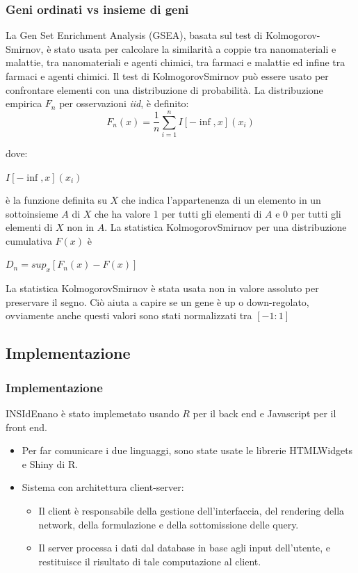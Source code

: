 \documentclass{beamer}
\begin{document}
\begin{frame}
\frametitle{Geni ordinati vs insieme di geni}
La Gen Set Enrichment Analysis (GSEA), basata sul test di Kolmogorov-Smirnov, è stato usata per calcolare la similarità a coppie tra nanomateriali e malattie, tra nanomateriali e agenti chimici, tra farmaci e malattie ed infine tra farmaci e agenti chimici. Il test di KolmogorovSmirnov può essere usato per confrontare elementi con una distribuzione di probabilità. La distribuzione empirica $F_n$ per osservazioni \textit{iid}, è definito:
\begin{equation}
F_n(x) = \frac{1}{n} \sum\limits_{i=1}^n I[-\inf,x](x_i)
\end{equation}
\end{frame}

\begin{frame}
dove:
\begin{center}
$I[-\inf,x](x_i)$
\end{center}
è la funzione definita su $X$ che indica l'appartenenza di un elemento in un sottoinsieme $A$ di $X$ che ha valore 1 per tutti gli elementi di $A$ e 0 per tutti gli elementi di $X$ non in $A$. La statistica KolmogorovSmirnov per una distribuzione cumulativa $F(x)$ è 
\begin{center}
$D_n = sup_x[F_n(x)- F(x)]$
\end{center}
La statistica KolmogorovSmirnov è stata usata non in valore assoluto per preservare il segno. Ciò aiuta a capire se un gene è up o down-regolato, ovviamente anche questi valori sono stati normalizzati tra $[-1:1]$
\end{frame}

\subsection{Implementazione}
\begin{frame}
\frametitle{Implementazione}
INSIdEnano è stato implemetato usando $R$ per il back end e Javascript per il front end.
\begin{itemize}
 \item Per far comunicare i due linguaggi, sono state usate le librerie HTMLWidgets e Shiny di R. 
 \item Sistema con architettura client-server: 
 \begin{itemize}
 \item Il client è responsabile della gestione dell'interfaccia, del rendering della network, della formulazione e della sottomissione delle query. 
 \item Il server processa i dati dal database in base agli input dell'utente, e restituisce il risultato di tale computazione al client.
\end{itemize}
\end{itemize}  
\end{frame}
\end{document}
